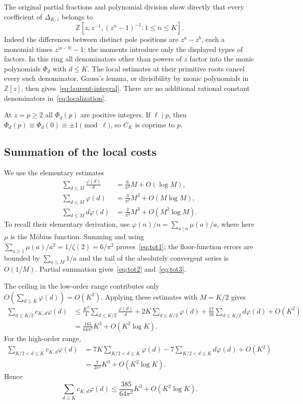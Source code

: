 \documentclass[11pt,letterpaper]{article}
\numberwithin{equation}{section}
\theoremstyle{remark}
\newcommand{\Z}{\mathbb Z}
\begin{document}
The original partial fractions and polynomial division show directly that every coefficient of $\Delta_{K,z}$ belongs to
\begin{equation}\label{eq:localization}
 \Z[z,z^{-1},(z^n-1)^{-1}:1\le n\le K].
\end{equation}
Indeed the differences between distinct pole positions are $z^a-z^b$, each a monomial times $z^{|a-b|}-1$; the moments introduce only the displayed types of factors. In this ring all denominators other than powers of $z$ factor into the monic polynomials $\Phi_d$ with $d\le K$. The local estimates at their primitive roots cancel every such denominator. Gauss's lemma, or divisibility by monic polynomials in $\Z[z]$, then gives~\eqref{eq:laurent-integral}. There are no additional rational constant denominators in~\eqref{eq:localization}.

At $z=p\ge2$ all $\Phi_d(p)$ are positive integers. If $\ell\mid p$, then $\Phi_d(p)\equiv\Phi_d(0)\equiv\pm1\pmod\ell$, so $C_K$ is coprime to $p$.

\subsection{Summation of the local costs}

We use the elementary estimates
\begin{align}
 \sum_{d\le M}\frac{\varphi(d)}d
   &=\frac6{\pi^2}M+O(\log M),\label{eq:tot1}\\
 \sum_{d\le M}\varphi(d)
   &=\frac3{\pi^2}M^2+O(M\log M),\label{eq:tot2}\\
 \sum_{d\le M}d\varphi(d)
   &=\frac2{\pi^2}M^3+O(M^2\log M).\label{eq:tot3}
\end{align}
To recall their elementary derivation, use $\varphi(n)/n=\sum_{a\mid n}\mu(a)/a$, where here $\mu$ is the M\"obius function. Summing and using $\sum_{a\ge1}\mu(a)/a^2=1/\zeta(2)=6/\pi^2$ proves~\eqref{eq:tot1}; the floor-function errors are bounded by $\sum_{a\le M}1/a$ and the tail of the absolutely convergent series is $O(1/M)$. Partial summation gives~\eqref{eq:tot2} and~\eqref{eq:tot3}.

The ceiling in the low-order range contributes only $O(\sum_{d\le K}\varphi(d))=O(K^2)$. Applying these estimates with $M=K/2$ gives
\begin{align*}
 \sum_{d\le K/2}c_{K,d}\varphi(d)
 &\le\frac{K^2}{4}\sum_{d\le K/2}\frac{\varphi(d)}d
   +2K\sum_{d\le K/2}\varphi(d)
   +\frac{17}{16}\sum_{d\le K/2}d\varphi(d)+O(K^2)\\
 &=\frac{161}{64\pi^2}K^3+O(K^2\log K).
\end{align*}
For the high-order range,
\begin{align*}
 \sum_{K/2<d\le K}c_{K,d}\varphi(d)
 &=7K\sum_{K/2<d\le K}\varphi(d)
     -7\sum_{K/2<d\le K}d\varphi(d)+O(K^2)\\
 &=\frac7{2\pi^2}K^3+O(K^2\log K).
\end{align*}
Hence
\begin{equation}\label{eq:phi-cost}
 \sum_{d\le K}c_{K,d}\varphi(d)
 \le\frac{385}{64\pi^2}K^3+O(K^2\log K).
\end{equation}
\end{document}
